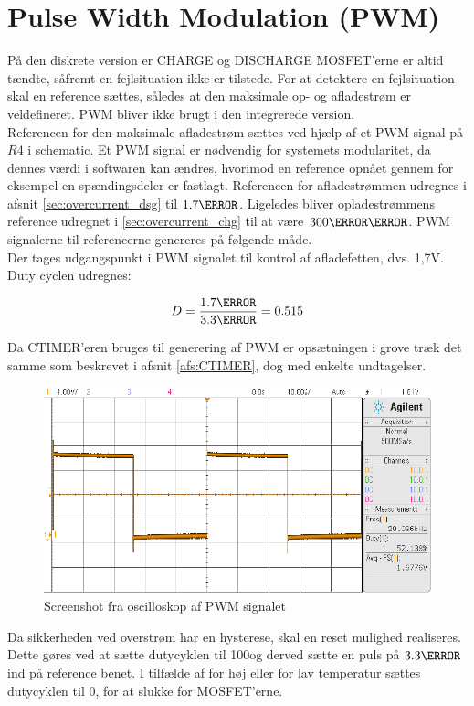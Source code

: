\section{Pulse Width Modulation (PWM)}\label{afs:PWM}
På den diskrete version er CHARGE og DISCHARGE MOSFET'erne er altid tændte, såfremt en fejlsituation ikke er tilstede. For at detektere en fejlsituation skal en reference sættes, således at den maksimale op- og afladestrøm er veldefineret. PWM bliver ikke brugt i den integrerede version. \\

Referencen for den maksimale afladestrøm sættes ved hjælp af et PWM signal på $R4$ i schematic. Et PWM signal er nødvendig for systemets modularitet, da dennes værdi i softwaren kan ændres, hvorimod en reference opnået gennem for eksempel en spændingsdeler er fastlagt. Referencen for afladestrømmen udregnes i afsnit \ref{sec:overcurrent_dsg} til $1.7\volt$. Ligeledes bliver opladestrømmens reference udregnet i \ref{sec:overcurrent_chg} til at være $300\milli\volt$. PWM signalerne til referencerne genereres på følgende måde. \\

Der tages udgangspunkt i PWM signalet til kontrol af afladefetten, dvs. 1,7V. Duty cyclen udregnes: 

\begin {equation}
D = \frac{1.7\volt}{3.3\volt} = 0.515
\label{eq:duty}
\end {equation}

Da CTIMER'eren bruges til generering af PWM er opsætningen i grove træk det samme som beskrevet i afsnit \ref{afs:CTIMER}, dog med enkelte undtagelser. 

\begin{figure}[h]
	\centering
	\includegraphics[width=15cm]{billeder/pwm_scope.png}
	\caption{Screenshot fra oscilloskop af PWM signalet}
	\label{fig:pwm_scope}
\end{figure}





Da sikkerheden ved overstrøm har en hysterese, skal en reset mulighed realiseres. Dette gøres ved at sætte dutycyklen til 100\percent\space og derved sætte en puls på $3.3\volt$ ind på reference benet. I tilfælde af for høj eller for lav temperatur sættes dutycyklen til 0\percent, for at slukke for MOSFET'erne.

